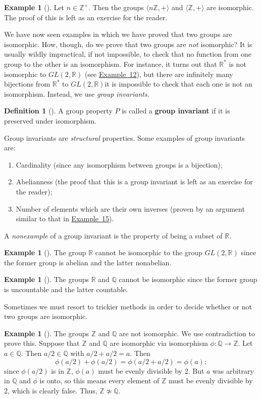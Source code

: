 \documentclass[10pt,openany,oneside]{book}
\newcommand{\terminology}[1]{\textbf{#1}}
\theoremstyle{plain}
\theoremstyle{definition}
\newtheorem{definition}[theorem]{Definition}
\theoremstyle{definition}
\theoremstyle{definition}
\newtheorem{example}[theorem]{Example}
\theoremstyle{definition}
\numberwithin{equation}{section}
\def\Z{\mathbb{Z}}
\def\R{\mathbb{R}}
\def\Q{\mathbb{Q}}
\begin{document}
\begin{example}[]\label{example-27}
Let \(n\in \Z^+\). Then the groups \(\langle n\Z,+\rangle\) and \(\langle \Z,+\rangle\) are isomorphic. The proof of this is left as an exercise for the reader.%
\end{example}
We have now seen examples in which we have proved that two groups are isomorphic. How, though, do we prove that two groups are \emph{not} isomorphic? It is usually wildly impractical, if not impossible, to check that no function from one group to the other is an isomorphism. For instance, it turns out that \(\R^*\) is not isomorphic to \(GL(2,\R)\) (see \hyperref[rgl]{Example~12}), but there are infinitely many bijections from \(\R^*\) to \(GL(2,\R)\)\textemdash{}it is impossible to check that each one is not an isomorphism. Instead, we use \emph{group invariants}.%
\begin{definition}[{}]\label{definition-34}
A group property \(P\) is called a \terminology{group invariant} if it is preserved under isomorphism.%
\end{definition}
Group invariants are \emph{structural} properties. Some examples of group invariants are: \leavevmode%
\begin{enumerate}
\item\hypertarget{li-155}{}Cardinality (since any isomorphism between groups is a bijection);%
\item\hypertarget{li-156}{}Abelianness (the proof that this is a group invariant is left as an exercise for the reader);%
\item\hypertarget{li-157}{}Number of elements which are their own inverses (proven by an argument similar to that in \hyperref[x4nonunique]{Example~15}).%
\end{enumerate}
%
\par
A \emph{nonexample} of a group invariant is the property of being a subset of \(\R\).%
\begin{example}[]\label{rgl}
The group \(\R\) cannot be isomorphic to the group \(GL(2,\R)\) since the former group is abelian and the latter nonabelian.%
\end{example}
\begin{example}[]\label{example-29}
The groups \(\R\) and \(\Q\) cannot be isomorphic since the former group is uncountable and the latter countable.%
\end{example}
Sometimes we must resort to trickier methods in order to decide whether or not two groups are isomorphic.%
\begin{example}[]\label{zq}
The groups \(\Z\) and \(\Q\) are not isomorphic. We use contradiction to prove this. Suppose that \(\Z\) and \(\Q\) are isomorphic via isomorphism \(\phi :\Q \to \Z\). Let \(a\in \Q\). Then \(a/2 \in \Q\) with \(a/2 + a/2 =a\). Then%
\begin{equation*}
\phi(a/2)+\phi(a/2)=\phi(a/2+a/2)=\phi(a);
\end{equation*}
since \(\phi(a/2)\) is in \(\Z\), \(\phi(a)\) must be evenly divisible by 2. But \(a\) was arbitrary in \(\Q\) and \(\phi\) is onto, so this means every element of \(\Z\) must be evenly divisible by 2, which is clearly false. Thus, \(\Z\not\simeq \Q\).%
\end{example}
\end{document}
